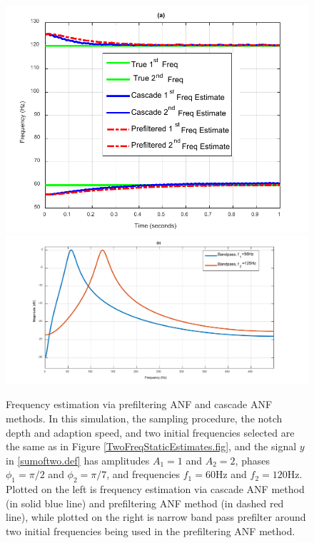 \documentclass{UCF_ETD}
\begin{document}
\begin{figure}[H]
\begin{center}
\includegraphics[scale=0.8]{NonuniformANF/Figure18aMultiFirstComparison} %
\includegraphics[scale=0.5]{NonuniformANF/Figure18bPrefilteredBandPass} %
\caption{Frequency estimation  via prefiltering ANF  and cascade ANF methods.
  In this simulation, the sampling  procedure, the notch  depth  and adaption speed,
  and 
  two initial frequencies  selected
    are the same as in Figure \ref{TwoFreqStaticEstimates.fig},
 and the signal $y$ in \eqref{sumoftwo.def}
has amplitudes $A_1=1$ and $A_2=2$, phases $\phi_1=\pi/2$ and $\phi_2=\pi/7$, and frequencies $f_1=60$Hz and $f_2=120$Hz.
Plotted on the left  is frequency estimation
 via cascade ANF method (in solid blue line) and prefiltering ANF method (in dashed red line), while plotted on the right is  narrow band pass
 prefilter around two initial frequencies being used in the prefiltering ANF method.
  }
\label{Case2}
\end{center}
\end{figure}
\end{document}
